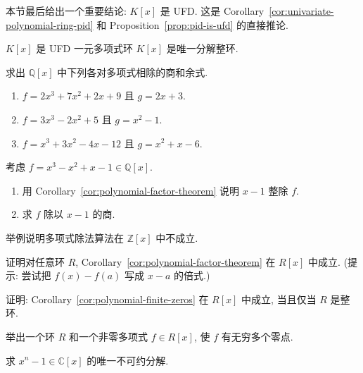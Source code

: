 本节最后给出一个重要结论: $K[x]$ 是 UFD. 这是 Corollary~\ref{cor:univariate-polynomial-ring-pid} 和 Proposition~\ref{prop:pid-is-ufd} 的直接推论.

\begin{Corollary}{{\textmd{$K[x]$} 是 UFD}}\label{cor:univariate-polynomial-ring-ufd}
  一元多项式环 $K[x]$ 是唯一分解整环.
\end{Corollary}

\BookExerciseHeading
\begin{BookExercises}
  \item\label{ex:polynomial-division-computations} 求出 $\mathbb{Q}[x]$ 中下列各对多项式相除的商和余式.
    \begin{enumerate}[label=(\alph*)]
      \item $f=2x^{3}+7x^{2}+2x+9$ 且 $g=2x+3$.
      \item $f=3x^{3}-2x^{2}+5$ 且 $g=x^{2}-1$.
      \item $f=x^{3}+3x^{2}-4x-12$ 且 $g=x^{2}+x-6$.
    \end{enumerate}
  \item\label{ex:factor-and-divide-at-one} 考虑 $f=x^{3}-x^{2}+x-1\in\mathbb{Q}[x]$.
    \begin{enumerate}[label=(\alph*)]
      \item 用 Corollary~\ref{cor:polynomial-factor-theorem} 说明 $x-1$ 整除 $f$.
      \item 求 $f$ 除以 $x-1$ 的商.
    \end{enumerate}
  \item\label{ex:division-algorithm-fails-in-zz} 举例说明多项式除法算法在 $\mathbb{Z}[x]$ 中不成立.
  \item\label{ex:factor-theorem-over-ring} 证明对任意环 $R$, Corollary~\ref{cor:polynomial-factor-theorem} 在 $R[x]$ 中成立. (提示: 尝试把 $f(x)-f(a)$ 写成 $x-a$ 的倍式.)
  \item\label{ex:finite-zeros-iff-domain} 证明: Corollary~\ref{cor:polynomial-finite-zeros} 在 $R[x]$ 中成立, 当且仅当 $R$ 是整环.
  \item\label{ex:nonzero-polynomial-infinite-zeros} 举出一个环 $R$ 和一个非零多项式 $f\in R[x]$, 使 $f$ 有无穷多个零点.
  \item\label{ex:complex-power-minus-one-unique-factorization} 求 $x^{n}-1\in\mathbb{C}[x]$ 的唯一不可约分解.
\end{BookExercises}
